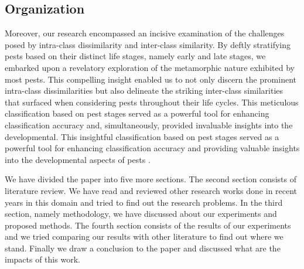 \subsection{Organization}
Moreover, our research encompassed an incisive examination of the challenges posed by intra-class dissimilarity and inter-class similarity. By deftly stratifying pests based on their distinct life stages, namely early and late stages, we embarked upon a revelatory exploration of the metamorphic nature exhibited by most pests. This compelling insight enabled us to not only discern the prominent intra-class dissimilarities but also delineate the striking inter-class similarities that surfaced when considering pests throughout their life cycles. This meticulous classification based on pest stages served as a powerful tool for enhancing classification accuracy and, simultaneously, provided invaluable insights into the developmental. This insightful classification based on pest stages served as a powerful tool for enhancing classification accuracy and providing valuable insights into the developmental aspects of pests \cite{ji20183d, lin2019fourier}.

We have divided the paper into five more sections. The second section consists of literature review. We have read and reviewed other research works done in recent years in this domain and tried to find out the research problems. In the third section, namely methodology, we have discussed about our experiments and proposed methods. The fourth section consists of the results of our experiments and we tried comparing our results with other literature to find out where we stand. Finally we draw a conclusion to the paper and discussed what are the impacts of this work.